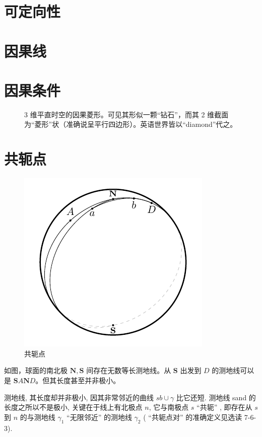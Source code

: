 \section{可定向性}

\section{因果线}

\section{因果条件}



\begin{figure}[h!]\centering
    \caption{3 维平直时空的因果菱形。可见其形似一颗“钻石”，而其 2 维截面为“菱形”状（准确说呈平行四边形）。英语世界皆以“diamond”代之。}
\end{figure}


\section{共轭点}

\begin{figure}
    \centering
    \includegraphics[width=.3\textwidth]{fig/chpt01/sphere.pdf}
    \caption{共轭点}
\end{figure}

如图，球面的南北极 $\mathbf N,\mathbf S$ 间存在无数等长测地线。从 $\mathbf S$ 出发到 $D$ 的测地线可以是 $\mathbf S A \mathbf N D$。但其长度甚至并非极小。


测地线, 其长度却并非极小, 因其非常邻近的曲线 $s b \cup \gamma$ 比它还短. 测地线 sand 的长度之所以不是极小, 关键在于线上有北极点 $n$, 它与南极点 $s$ “共轭” , 即存在从 $s$ 到 $n$ 的与测地线 $\gamma_1$ “无限邻近” 的测地线 $\gamma_2$ ( “共轭点对” 的准确定义见选读 7-6-3). 

